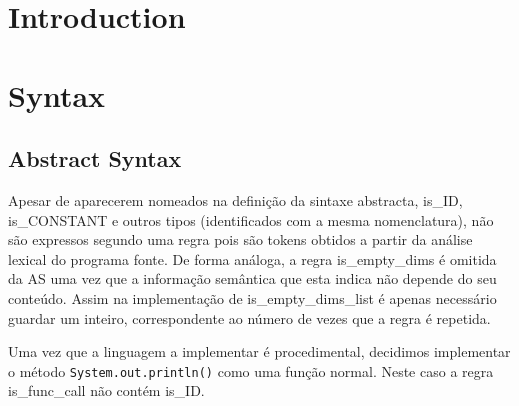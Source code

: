 \documentclass[a4paper]{article}
\title{\documentTitle}
\author{\documentAuthors{}}
\begin{document}
\renewcommand{\figurename}{Figure}
\maketitle
\cleardoublepage

\tableofcontents
\cleardoublepage

\setlength{\parindent}{1cm}
\setlength{\parskip}{0.3cm}

\section{Introduction}

\cleardoublepage
\section {Syntax}

\cleardoublepage
\subsection{Abstract Syntax}
\indent \indent Apesar de aparecerem nomeados na definição da sintaxe abstracta, is\_ID, \\
is\_CONSTANT e outros tipos (identificados com a mesma nomenclatura),
não são expressos segundo uma regra pois são tokens obtidos a partir da análise lexical do programa fonte.
De forma análoga, a regra is\_empty\_dims é omitida da AS uma vez que a informação semântica que esta indica não depende do seu conteúdo.
Assim na implementação de is\_empty\_dims\_list é apenas necessário guardar um inteiro, correspondente ao número de vezes que a regra é repetida.

Uma vez que a linguagem a implementar é procedimental, decidimos implementar o método \texttt{System.out.println()} como uma função normal.
Neste caso a regra is\_func\_call não contém is\_ID. 
\end{document}
